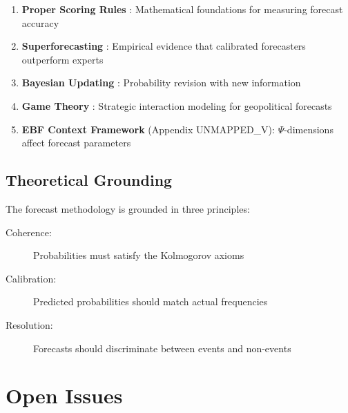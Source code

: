 \begin{enumerate}
    \item \textbf{Proper Scoring Rules} \citep{brier1950verification, good1952rational}: Mathematical foundations for measuring forecast accuracy
    \item \textbf{Superforecasting} \citep{tetlock2015superforecasting}: Empirical evidence that calibrated forecasters outperform experts
    \item \textbf{Bayesian Updating} \citep{bayes1763essay}: Probability revision with new information
    \item \textbf{Game Theory} \citep{selten1965spieltheoretische}: Strategic interaction modeling for geopolitical forecasts
    \item \textbf{EBF Context Framework} (Appendix UNMAPPED_V): $\Psi$-dimensions affect forecast parameters
\end{enumerate}

\subsection{Theoretical Grounding}

The forecast methodology is grounded in three principles:

\begin{description}
    \item[Coherence:] Probabilities must satisfy the Kolmogorov axioms
    \item[Calibration:] Predicted probabilities should match actual frequencies
    \item[Resolution:] Forecasts should discriminate between events and non-events
\end{description}

\section{Open Issues}
\label{sec:fct-open-issues}

